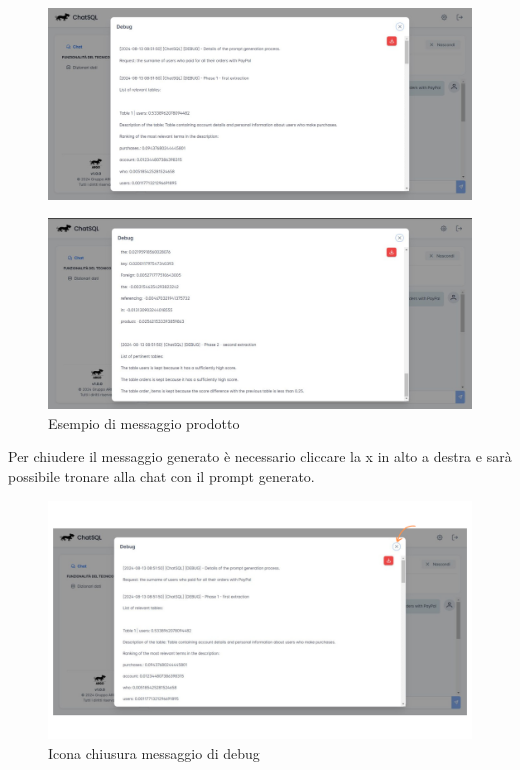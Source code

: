 \begin{figure}[H]
  \centering
  \includegraphics[width=1\textwidth]{assets/analisi_debug1.jpg}
\end{figure}

\begin{figure}[H]
  \centering
  \includegraphics[width=1\textwidth]{assets/analisi_debug2.jpg}
  \caption{Esempio di messaggio prodotto}
\end{figure}

Per chiudere il messaggio generato è necessario cliccare la x in alto a destra e sarà possibile tronare alla chat con il prompt generato.
\begin{figure}[H]
  \centering
  \includegraphics[width=1\textwidth]{assets/tasto_close_debug.png}
  \caption{Icona chiusura messaggio di debug}
\end{figure}

